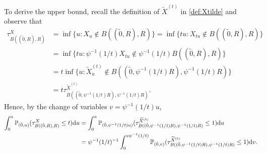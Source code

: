 \documentclass[11pt]{article}
\begin{document}
\begin{doublespace}
To derive the upper bound, recall the definition of $\widetilde{X}^{(t)}$ in \eqref{def:Xtilde} and observe that
\begin{align*}
\tau_{B((\tilde{0},R),R)}^{X}
&=\inf\{u: X_{u}\notin B((\tilde{0},R),R)\}=\inf\{tu: X_{tu}\notin B((\tilde{0},R),R)\}\\
&=\inf\{tu: \psi^{-1}(1/t)X_{tu} \notin \psi^{-1}(1/t)B((\tilde{0},R),R) \}\\
&=t\inf\{u: \widetilde{X}_{u}^{(t)}\notin B((\tilde{0},\psi^{-1}(1/t)R),\psi^{-1}(1/t)R) \}\\
&=t\tau_{B((\tilde{0},\psi^{-1}(1/t)R),\psi^{-1}(1/t)R)}^{\widetilde{X}^{(t)}}.
\end{align*}
Hence, by the change of variables $v=\psi^{-1}(1/t)u$, 
\begin{align}\label{eqn:ball lb1}
\int_{0}^{a}{\mathbb P}_{(\tilde{0},u)}(\tau^{X}_{B((\tilde{0},R),R)}\leq t)\mathrm{d} u\nonumber
&=\int_{0}^{a}{\mathbb P}_{(\tilde{0},\psi^{-1}(1/t)u)}(\tau_{B((\tilde{0},\psi^{-1}(1/t)R),\psi^{-1}(1/t)R)}^{\widetilde{X}^{(t)}} \leq 1)\mathrm{d} u\nonumber\\
&=\psi^{-1}(1/t)^{-1}\int_{0}^{a\psi^{-1}(1/t)}{\mathbb P}_{(\tilde{0},v)}(\tau_{B((\tilde{0},\psi^{-1}(1/t)R),\psi^{-1}(1/t)R)}^{\widetilde{X}^{(t)}} \leq 1)\mathrm{d} v.
\end{align}



\end{doublespace}
\end{document}
